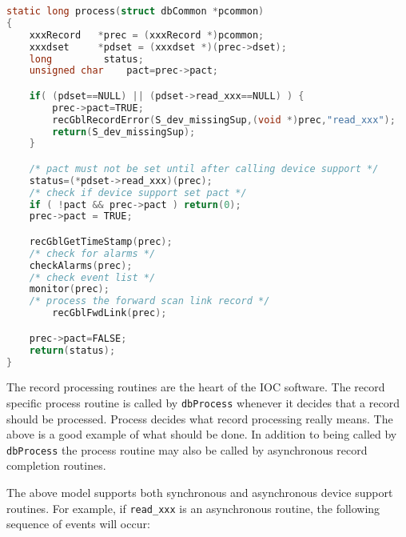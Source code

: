 \begin{lstlisting}[language=C]
static long process(struct dbCommon *pcommon)
{
    xxxRecord	*prec = (xxxRecord *)pcommon;
	xxxdset		*pdset = (xxxdset *)(prec->dset);
	long		 status;
	unsigned char    pact=prec->pact;

	if( (pdset==NULL) || (pdset->read_xxx==NULL) ) {
		prec->pact=TRUE;
		recGblRecordError(S_dev_missingSup,(void *)prec,"read_xxx");
		return(S_dev_missingSup);
	}

	/* pact must not be set until after calling device support */
	status=(*pdset->read_xxx)(prec);
	/* check if device support set pact */
	if ( !pact && prec->pact ) return(0);
	prec->pact = TRUE;

	recGblGetTimeStamp(prec);
	/* check for alarms */
	checkAlarms(prec);
	/* check event list */
	monitor(prec);
	/* process the forward scan link record */
        recGblFwdLink(prec);

	prec->pact=FALSE;
	return(status);
}
\end{lstlisting}

The record processing routines are the heart of the IOC software.
The record specific process routine is called by \verb|dbProcess| whenever it decides that a record should be processed.
Process decides what record processing really means.
The above is a good example of what should be done.
In addition to being called by \verb|dbProcess| the process routine may also be called by asynchronous record completion routines.

The above model supports both synchronous and asynchronous device support routines.
For example, if \verb|read_xxx| is an asynchronous routine, the following sequence of events will occur:

